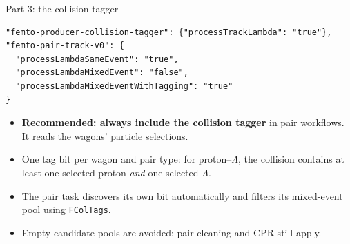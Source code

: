 \begin{frame}[fragile]{Part 3: the collision tagger}
 \begin{lstlisting}
"femto-producer-collision-tagger": {"processTrackLambda": "true"},
"femto-pair-track-v0": {
  "processLambdaSameEvent": "true",
  "processLambdaMixedEvent": "false",
  "processLambdaMixedEventWithTagging": "true"
}
 \end{lstlisting}
 \begin{itemize}
 \item \textbf{Recommended: always include the collision tagger} in pair workflows. It reads the wagons' particle selections.
 \item One tag bit per wagon and pair type: for proton--$\Lambda$, the collision contains at least one selected proton \emph{and} one selected $\Lambda$.
 \item The pair task discovers its own bit automatically and filters its mixed-event pool using \texttt{FColTags}.
 \item Empty candidate pools are avoided; pair cleaning and CPR still apply.
 \end{itemize}
\end{frame}

